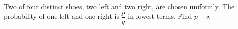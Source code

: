 Two of four distinct shoes, two left and two right, are chosen uniformly. The probability of one left and one right is $\dfrac{p}{q}$ in lowest terms. Find $p+q$.
